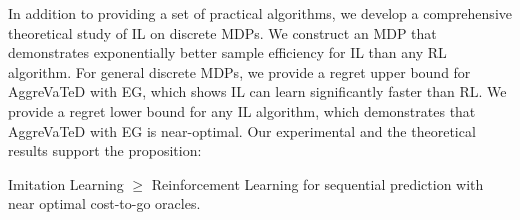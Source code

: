 \documentclass{article}
\newcommand{\BB}[1]{\textcolor{red}{\bf Byron: {#1}}}
\newcommand{\drew}[1]{\textcolor{blue}{\bf Drew: {#1}}}
\newcommand{\todo}{\textcolor{red}{\textbf{[TODO]}}}
\begin{document}

In addition to providing a set of practical algorithms, we develop a comprehensive theoretical study of IL on discrete MDPs. We construct an MDP that demonstrates exponentially better sample efficiency for IL than any RL algorithm. For general discrete MDPs, we provide a regret upper bound for AggreVaTeD with EG, which shows IL can learn significantly faster than RL. We provide a regret lower bound for any IL algorithm, which demonstrates that AggreVaTeD with EG is near-optimal. Our experimental and the theoretical results support the proposition: 
\begin{displayquote}
Imitation Learning $\ge$ Reinforcement Learning for sequential prediction with near optimal cost-to-go oracles.
\end{displayquote}




\end{document}
